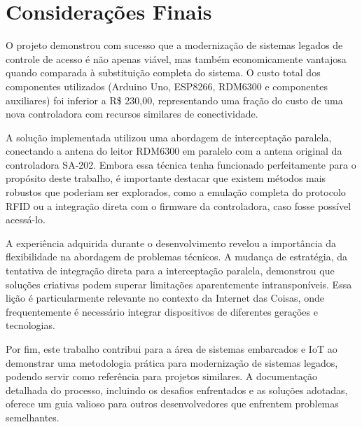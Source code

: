 \section{Considerações Finais}

O projeto demonstrou com sucesso que a modernização de sistemas legados de controle de acesso é não apenas viável, mas também economicamente vantajosa quando comparada à substituição completa do sistema. O custo total dos componentes utilizados (Arduino Uno, ESP8266, RDM6300 e componentes auxiliares) foi inferior a R\$ 230,00, representando uma fração do custo de uma nova controladora com recursos similares de conectividade.

A solução implementada utilizou uma abordagem de interceptação paralela, conectando a antena do leitor RDM6300 em paralelo com a antena original da controladora SA-202. Embora essa técnica tenha funcionado perfeitamente para o propósito deste trabalho, é importante destacar que existem métodos mais robustos que poderiam ser explorados, como a emulação completa do protocolo RFID ou a integração direta com o firmware da controladora, caso fosse possível acessá-lo.

A experiência adquirida durante o desenvolvimento revelou a importância da flexibilidade na abordagem de problemas técnicos. A mudança de estratégia, da tentativa de integração direta para a interceptação paralela, demonstrou que soluções criativas podem superar limitações aparentemente intransponíveis. Essa lição é particularmente relevante no contexto da Internet das Coisas, onde frequentemente é necessário integrar dispositivos de diferentes gerações e tecnologias.


Por fim, este trabalho contribui para a área de sistemas embarcados e IoT ao demonstrar uma metodologia prática para modernização de sistemas legados, podendo servir como referência para projetos similares. A documentação detalhada do processo, incluindo os desafios enfrentados e as soluções adotadas, oferece um guia valioso para outros desenvolvedores que enfrentem problemas semelhantes.

